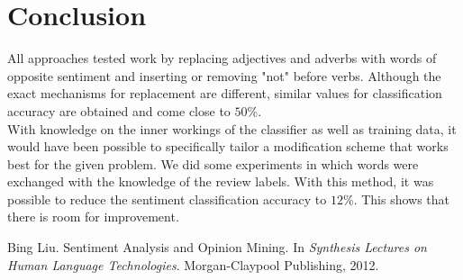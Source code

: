 \documentclass[11pt,a4paper]{article}
\begin{document}
\section{Conclusion}
All approaches tested work by replacing adjectives and adverbs with words of opposite sentiment and inserting or removing "not" before verbs. Although the exact mechanisms for replacement are different,  similar values for classification accuracy are obtained and come close to $50$\%.\\
With knowledge on the inner workings of the classifier as well as training data, it would have been possible to specifically tailor a modification scheme that works best for the given problem. We did some experiments in which words were exchanged with the knowledge of the review labels. With this method, it was possible to reduce the sentiment classification accuracy to $12$\%. This shows that there is room for improvement.

\begin{thebibliography}{9}
Bing Liu. Sentiment Analysis and Opinion Mining.
In \textit{Synthesis Lectures on Human Language Technologies}. 
Morgan-Claypool Publishing, 2012.
\end{thebibliography}
\end{document}
